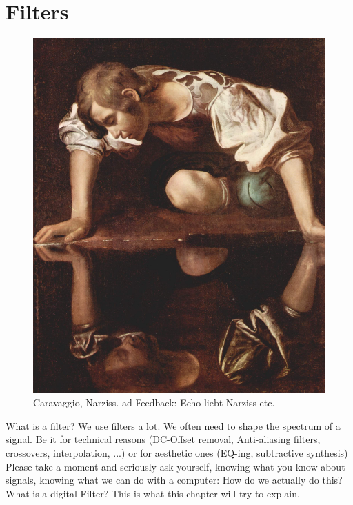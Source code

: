 \chapter{Filters}
\label{chap:filters}


\begin{figure}[H]
	\begin{center}
		\includegraphics[width = 14cm]{img/Narciss_Caravaggio.jpg}
		\caption{Caravaggio, Narziss. ad Feedback: Echo liebt Narziss etc.}
		\label{fig:name}
	\end{center}
\end{figure}





What is a filter? We use filters a lot. We often need to shape the spectrum of a signal. Be it for technical reasons (DC-Offset removal, Anti-aliasing filters, crossovers, interpolation, ...) or for aesthetic ones (EQ-ing, subtractive synthesis)\\
Please take a moment and seriously ask yourself, knowing what you know about signals, knowing what we can do with a computer: How do we actually do this? What is a digital Filter? This is what this chapter will try to explain.\\

